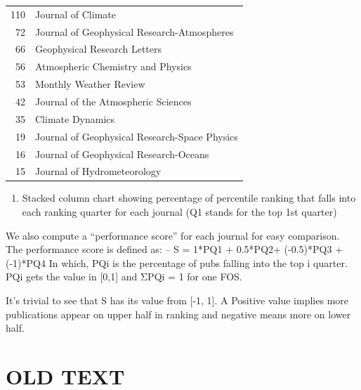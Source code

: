 \documentclass{sig-alternate}
\begin{document}
\begin{table}[h]
\begin{tiny}
\begin{tabular}{rl}
110	&  Journal of Climate \\
72	&  Journal of Geophysical Research-Atmospheres \\
66	&  Geophysical Research Letters \\
56	&  Atmospheric Chemistry and Physics \\
53	&  Monthly Weather Review \\
42	&  Journal of the Atmospheric Sciences \\
35	&  Climate Dynamics \\
19	&  Journal of Geophysical Research-Space Physics \\
16	&  Journal of Geophysical Research-Oceans \\
15	&  Journal of Hydrometeorology \\
\end{tabular}
\end{tiny}
\end{table}

\begin{enumerate}
\item	Stacked column chart showing percentage of percentile ranking that falls into each ranking quarter for each journal (Q1 stands for the top 1st quarter)
\end{enumerate}

We also compute a ``performance score'' for each journal for easy comparison. The performance score is defined as:
–	S = 1*PQ1 + 0.5*PQ2+ (-0.5)*PQ3 + (-1)*PQ4
In which, PQi is the percentage of pubs falling into the top i quarter. PQi gets the value in [0,1] and ΣPQi = 1 for one FOS.

It's trivial to see that S has its value from [-1, 1]. A Positive value implies more publications appear on upper half in ranking and negative means more on lower half.


\clearpage

\section{OLD TEXT}
\end{document}
